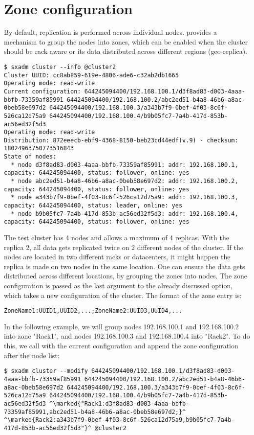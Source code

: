 \section{Zone configuration}
By default, replication is performed across individual nodes. \SX provides
a mechanism to group the nodes into zones, which can be enabled when the
cluster should be rack aware or its data distributed across different regions
(geo-replica).
\begin{lstlisting}
$ sxadm cluster --info @cluster2
Cluster UUID: cc8ab859-619e-4806-ade6-c32ab2db1665
Operating mode: read-write
Current configuration: 644245094400/192.168.100.1/d3f8ad83-d003-4aaa-bbfb-73359af85991 644245094400/192.168.100.2/abc2ed51-b4a8-46b6-a8ac-0beb58e697d2 644245094400/192.168.100.3/a343b7f9-0bef-4f03-8c6f-526ca12d75a9 644245094400/192.168.100.4/b9b05fc7-7a4b-417d-853b-ac56ed32f5d3 
Operating mode: read-write
Distribution: 872eeecb-ebf9-4368-8150-beb23cd44edf(v.9) - checksum: 18024963750773516843
State of nodes:
  * node d3f8ad83-d003-4aaa-bbfb-73359af85991: addr: 192.168.100.1, capacity: 644245094400, status: follower, online: yes
  * node abc2ed51-b4a8-46b6-a8ac-0beb58e697d2: addr: 192.168.100.2, capacity: 644245094400, status: follower, online: yes
  * node a343b7f9-0bef-4f03-8c6f-526ca12d75a9: addr: 192.168.100.3, capacity: 644245094400, status: leader, online: yes
  * node b9b05fc7-7a4b-417d-853b-ac56ed32f5d3: addr: 192.168.100.4, capacity: 644245094400, status: follower, online: yes
\end{lstlisting}
The test cluster has 4 nodes and allows a maximum of 4 replicas. With the
replica 2, all data gets replicated twice on 2 different nodes of the
cluster. If the nodes are located in two different racks or datacenters,
it might happen the replica is made on two nodes in the same location.
One can ensure the data gets distributed across different locations, by
grouping the zones into nodes. The zone configuration is passed as the
last argument to the already discussed  option,
which takes a new configuration of the cluster. The format of the zone entry is:
\begin{lstlisting}
ZoneName1:UUID1,UUID2,...;ZoneName2:UUID3,UUID4,...
\end{lstlisting}
In the following example, we will group nodes 192.168.100.1 and
192.168.100.2 into zone "Rack1", and nodes 192.168.100.3 and
192.168.100.4 into "Rack2". To do this, we call 
with the current configuration and append the zone configuration after
the node list:
\ifpdf
\begin{lstlisting}
$ sxadm cluster --modify 644245094400/192.168.100.1/d3f8ad83-d003-4aaa-bbfb-73359af85991 644245094400/192.168.100.2/abc2ed51-b4a8-46b6-a8ac-0beb58e697d2 644245094400/192.168.100.3/a343b7f9-0bef-4f03-8c6f-526ca12d75a9 644245094400/192.168.100.4/b9b05fc7-7a4b-417d-853b-ac56ed32f5d3 ^\marked{"Rack1:d3f8ad83-d003-4aaa-bbfb-73359af85991,abc2ed51-b4a8-46b6-a8ac-0beb58e697d2;}^ ^\marked{Rack2:a343b7f9-0bef-4f03-8c6f-526ca12d75a9,b9b05fc7-7a4b-417d-853b-ac56ed32f5d3"}^ @cluster2
\end{lstlisting}
